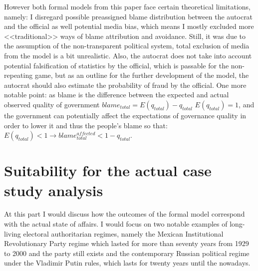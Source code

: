 \documentclass[a4paper, 12pt]{article}
\begin{document}
	However both formal models from this paper face certain theoretical limitations, namely: I disregard possible preassigned blame distribution between the autocrat and the official as well potential media bias, which means I mostly excluded more <<traditional>> ways of blame attribution and avoidance. Still, it was due to the assumption of the non-transparent political system, total exclusion of media from the model is a bit unrealistic. Also, the autocrat does not take into account potential falsification of statistics by the official, which is passable for the non-repeating game, but as an outline for the further development of the model, the autocrat should also estimate the probability of fraud by the official. One more notable point: as blame is the difference between the expected and actual observed quality of government $blame_{total} = E(q_{total}) - q_{total}$ \textbar $E(q_{total}) = 1$, and the government can potentially affect the expectations of governance quality in order to lower it and thus the people's blame so that: $E(q_{total}) < 1 \to blame_{total}^{affected} < 1 - q_{total}$.
	
	\section{Suitability for the actual case study analysis}
	
	\noindent At this part I would discuss how the outcomes of the formal model correspond with the actual state of affairs. I would focus on two notable examples of long-living electoral authoritarian regimes, namely the Mexican Institutional Revolutionary Party regime which lasted for more than seventy years from 1929 to 2000 and the party still exists and the contemporary Russian political regime under the Vladimir Putin rules, which lasts for twenty years until the nowadays.
	
\end{document}
